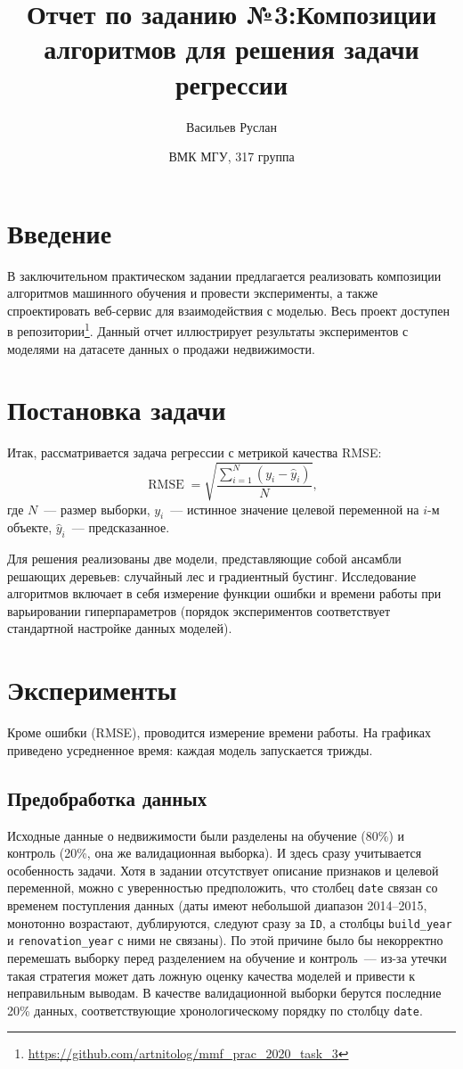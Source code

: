 \documentclass[12pt]{article}
\title{Отчет по заданию №3:\break Композиции алгоритмов для решения \break задачи регрессии}
\author{Васильев Руслан \and{ВМК МГУ, 317 группа}}
\begin{document}
\maketitle
\tableofcontents
\newpage
\section{Введение}
В заключительном практическом задании предлагается реализовать композиции алгоритмов машинного обучения и провести эксперименты, а также спроектировать веб-сервис для взаимодействия с моделью. Весь проект доступен в репозитории\footnote{\url{https://github.com/artnitolog/mmf_prac_2020_task_3}}. Данный отчет иллюстрирует результаты экспериментов с моделями на датасете данных о продажи недвижимости.

\section{Постановка задачи}

Итак, рассматривается задача регрессии с метрикой качества RMSE:
\begin{equation*}
    \operatorname{RMSE} = \sqrt{\frac{\sum_{i=1}^{N} (y_i - \hat{y}_i)}{N}},
\end{equation*}
где $N$~--- размер выборки, $y_i$~--- истинное значение целевой переменной на $i$-м объекте, $\hat{y}_i$~--- предсказанное.

Для решения реализованы две модели, представляющие собой ансамбли решающих деревьев: случайный лес и градиентный бустинг. Исследование алгоритмов включает в себя измерение функции ошибки и времени работы при варьировании гиперпараметров (порядок экспериментов соответствует стандартной настройке данных моделей).

\section{Эксперименты}
Кроме ошибки (RMSE), проводится измерение времени работы. На графиках приведено усредненное время: каждая модель запускается трижды.

\subsection{Предобработка данных}
Исходные данные о недвижимости были разделены на обучение (80\%) и контроль (20\%, она же валидационная выборка). И здесь сразу учитывается особенность задачи. Хотя в задании отсутствует описание признаков и целевой переменной, можно с уверенностью предположить, что столбец \verb|date| связан со временем поступления данных (даты имеют небольшой диапазон 2014--2015, монотонно возрастают, дублируются, следуют сразу за \verb|ID|, а столбцы \verb|build_year| и \verb|renovation_year| с ними не связаны). По этой причине было бы некорректно перемешать выборку перед разделением на обучение и контроль~--- из-за утечки такая стратегия может дать ложную оценку качества моделей и привести к неправильным выводам. В качестве валидационной выборки берутся последние 20\% данных, соответствующие хронологическому порядку по столбцу \verb|date|.
\end{document}
